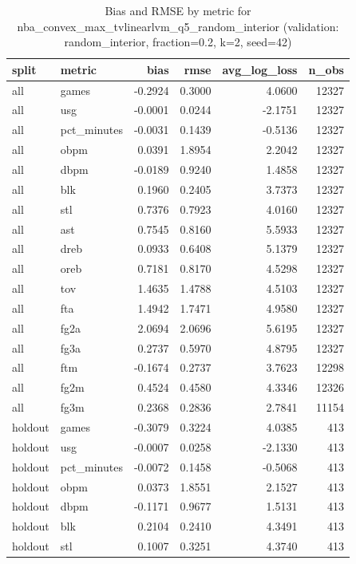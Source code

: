 \begin{table}
\caption{Bias and RMSE by metric for nba_convex_max_tvlinearlvm_q5_random_interior (validation: random_interior, fraction=0.2, k=2, seed=42)}
\label{tab:nba_convex_max_tvlinearlvm_q5_random_interior_vs_random_interior_f20_k2_s42_bias_rmse}
\begin{tabular}{llrrrr}
\toprule
split & metric & bias & rmse & avg\_log\_loss & n\_obs \\
\midrule
all & games & -0.2924 & 0.3000 & 4.0600 & 12327 \\
all & usg & -0.0001 & 0.0244 & -2.1751 & 12327 \\
all & pct\_minutes & -0.0031 & 0.1439 & -0.5136 & 12327 \\
all & obpm & 0.0391 & 1.8954 & 2.2042 & 12327 \\
all & dbpm & -0.0189 & 0.9240 & 1.4858 & 12327 \\
all & blk & 0.1960 & 0.2405 & 3.7373 & 12327 \\
all & stl & 0.7376 & 0.7923 & 4.0160 & 12327 \\
all & ast & 0.7545 & 0.8160 & 5.5933 & 12327 \\
all & dreb & 0.0933 & 0.6408 & 5.1379 & 12327 \\
all & oreb & 0.7181 & 0.8170 & 4.5298 & 12327 \\
all & tov & 1.4635 & 1.4788 & 4.5103 & 12327 \\
all & fta & 1.4942 & 1.7471 & 4.9580 & 12327 \\
all & fg2a & 2.0694 & 2.0696 & 5.6195 & 12327 \\
all & fg3a & 0.2737 & 0.5970 & 4.8795 & 12327 \\
all & ftm & -0.1674 & 0.2737 & 3.7623 & 12298 \\
all & fg2m & 0.4524 & 0.4580 & 4.3346 & 12326 \\
all & fg3m & 0.2368 & 0.2836 & 2.7841 & 11154 \\
holdout & games & -0.3079 & 0.3224 & 4.0385 & 413 \\
holdout & usg & -0.0007 & 0.0258 & -2.1330 & 413 \\
holdout & pct\_minutes & -0.0072 & 0.1458 & -0.5068 & 413 \\
holdout & obpm & 0.0373 & 1.8551 & 2.1527 & 413 \\
holdout & dbpm & -0.1171 & 0.9677 & 1.5131 & 413 \\
holdout & blk & 0.2104 & 0.2410 & 4.3491 & 413 \\
holdout & stl & 0.1007 & 0.3251 & 4.3740 & 413 \\

\end{tabular}
\end{table}
